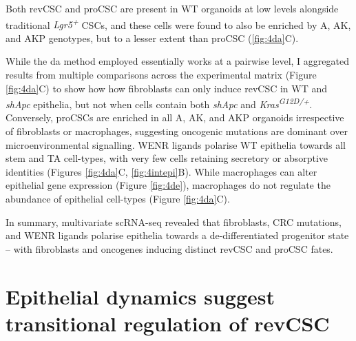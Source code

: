Both revCSC and proCSC are present in WT organoids at low levels alongside traditional \textit{Lgr5\textsuperscript{+}} CSCs, and these cells were found to also be enriched by A, AK, and AKP genotypes, but to a lesser extent than proCSC (\ref{fig:4da}C).

While the \acrshort{da} method employed essentially works at a pairwise level, I aggregated results from multiple comparisons across the experimental matrix (Figure \ref{fig:4da}C) to show how how fibroblasts can only induce revCSC in WT and \textit{shApc} epithelia, but not when cells contain both \textit{shApc} and \textit{Kras\textsuperscript{G12D/+}}. Conversely, proCSCs are enriched in all A, AK, and AKP organoids irrespective of fibroblasts or macrophages, suggesting oncogenic mutations are dominant over microenvironmental signalling. WENR ligands polarise WT epithelia towards all stem and TA cell-types, with very few cells retaining secretory or absorptive identities (Figures \ref{fig:4da}C, \ref{fig:4intepi}B). While macrophages can alter epithelial gene expression (Figure \ref{fig:4de}), macrophages do not regulate the abundance of epithelial cell-types (Figure \ref{fig:4da}C). 

In summary, multivariate scRNA-seq revealed that fibroblasts, CRC mutations, and WENR ligands polarise epithelia towards a de-differentiated progenitor state – with fibroblasts and oncogenes inducing distinct revCSC and proCSC fates.

\section{Epithelial dynamics suggest transitional regulation of revCSC}

